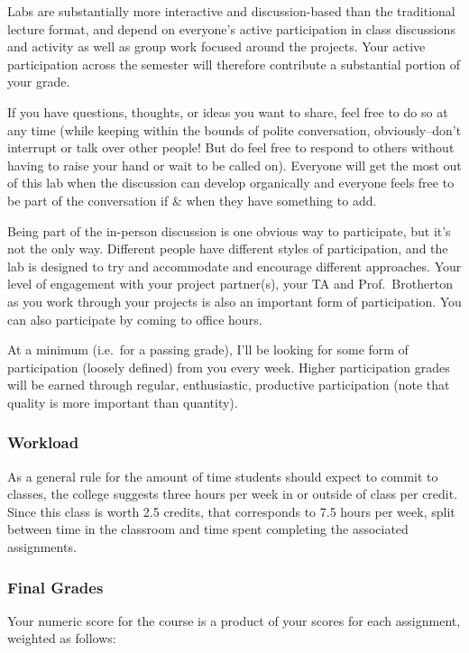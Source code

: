 \documentclass[
  letterpaper,
  DIV=11,
  numbers=noendperiod]{scrartcl}
\begin{document}
Labs are substantially more interactive and discussion-based than the
traditional lecture format, and depend on everyone's active
participation in class discussions and activity as well as group work
focused around the projects. Your active participation across the
semester will therefore contribute a substantial portion of your grade.

If you have questions, thoughts, or ideas you want to share, feel free
to do so at any time (while keeping within the bounds of polite
conversation, obviously--don't interrupt or talk over other people! But
do feel free to respond to others without having to raise your hand or
wait to be called on). Everyone will get the most out of this lab when
the discussion can develop organically and everyone feels free to be
part of the conversation if \& when they have something to add.

Being part of the in-person discussion is one obvious way to
participate, but it's not the only way. Different people have different
styles of participation, and the lab is designed to try and accommodate
and encourage different approaches. Your level of engagement with your
project partner(s), your TA and Prof.~Brotherton as you work through
your projects is also an important form of participation. You can also
participate by coming to office hours.

At a minimum (i.e.~for a passing grade), I'll be looking for some form
of participation (loosely defined) from you every week. Higher
participation grades will be earned through regular, enthusiastic,
productive participation (note that quality is more important than
quantity).

\subsubsection{Workload}\label{workload}

As a general rule for the amount of time students should expect to
commit to classes, the college suggests three hours per week in or
outside of class per credit. Since this class is worth 2.5 credits, that
corresponds to 7.5 hours per week, split between time in the classroom
and time spent completing the associated assignments.

\subsubsection{Final Grades}\label{final-grades}

Your numeric score for the course is a product of your scores for each
assignment, weighted as follows:
\end{document}
